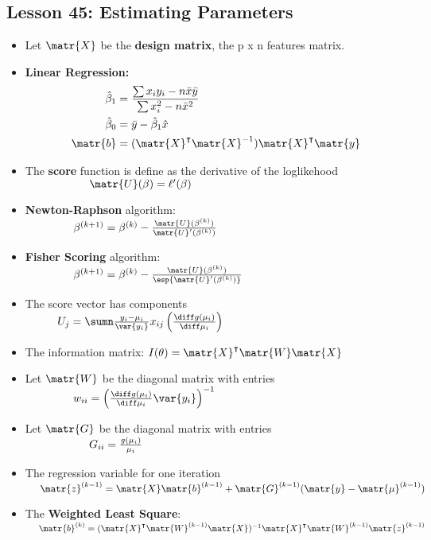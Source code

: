 \documentclass[10pt, french]{article}
\begin{document}
\begin{multicols*}{3}
\section*{Lesson 45: Estimating Parameters}
\begin{itemize}[align=left,leftmargin=*]
  \item Let $\matr{X}$ be the \textbf{design matrix}, the p x n features matrix.
  \item \textbf{Linear Regression:} \\
  \begin{align*}
    \hat{\beta}_1 &= \frac{\sum x_iy_i - n\bar{x}\bar{y}}{\sum x_i^2 - n\bar{x}^2} \\
    \hat{\beta}_0 &= \bar{y} - \hat{\beta}_1 \hat{x} \\
    \matr{b} &= (\matr{X}^\intercal\matr{X}^{-1})\matr{X}^\intercal \matr{y}
  \end{align*}
  \item The \textbf{score} function is define as the derivative of the loglikehood \\
  $\hspace*{2cm} \matr{U}(\beta) = \ell'(\beta)$
  \item \textbf{Newton-Raphson} algorithm: \\
  $\hspace*{1.5cm} \beta^{(k+1)} =\beta^{(k)} - \frac{\matr{U}(\beta^{(k)})}{\matr{U}'(\beta^{(k)})}$
  \item \textbf{Fisher Scoring} algorithm:\\
  $\hspace*{1.5cm} \beta^{(k+1)} =\beta^{(k)} - \frac{\matr{U}(\beta^{(k)})}{\esp{\matr{U}'(\beta^{(k)})}}$
  \item The score vector has components \\
  $\hspace*{1cm} U_j =\sumn \frac{y_i - \mu_i}{\var{y_i}}x_{ij}\left( \frac{\diff g(\mu_i)}{\diff \mu_i}\right)$
  \item The information matrix: $I(\theta) = \matr{X}^\intercal\matr{W}\matr{X}$
  \item Let $\matr{W}$ be the diagonal matrix with entries \\
  $\hspace*{1.5cm}w_{ii} =\left( \frac{\diff g(\mu_i)}{\diff\mu_i} \var{y_i}\right)^{-1}$
  \item Let $\matr{G}$ be the diagonal matrix with entries \\
  $\hspace*{2cm}G_{ii} =\frac{g(\mu_i)}{\mu_i}$
  \item The regression variable for one iteration \\
  $\hspace*{0.5cm}\matr{z}^{(k-1)}= \matr{X}\matr{b}^{(k-1)} + \matr{G}^{(k-1)}(\matr{y} - \matr{\mu}^{(k-1)})$
  \item The \textbf{Weighted Least Square}: \\
  $\hspace*{0.5cm} \matr{b}^{(k)} = (\matr{X}^\intercal\matr{W}^{(k-1)}\matr{X})^{-1}\matr{X}^\intercal\matr{W}^{(k-1)}\matr{z}^{(k-1)}$
\end{itemize}


\end{multicols*}
\end{document}
